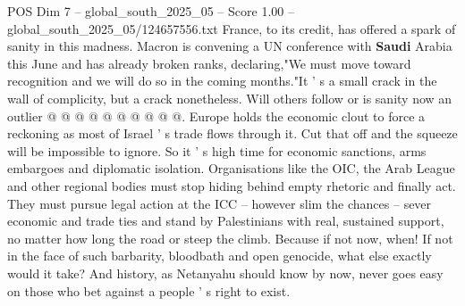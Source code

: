 \begin{textsample}{POS Dim 7 – global\_south\_2025\_05 – Score 1.00 – global\_south\_2025\_05/124657556.txt}
France, to its credit, has offered a spark of sanity in this madness.
Macron is convening a UN conference with \textbf{Saudi} Arabia this June and has already broken ranks, declaring,"We must move toward recognition and we will do so in the coming months."It ' s a small crack in the wall of complicity, but a crack nonetheless.
Will others follow or is sanity now an outlier @ @ @ @ @ @ @ @ @ @.
Europe holds the economic clout to force a reckoning as most of Israel ' s trade flows through it.
Cut that off and the squeeze will be impossible to ignore.
So it ' s high time for economic sanctions, arms embargoes and diplomatic isolation.
Organisations like the OIC, the Arab League and other regional bodies must stop hiding behind empty rhetoric and finally act.
They must pursue legal action at the ICC -- however slim the chances -- sever economic and trade ties and stand by Palestinians with real, sustained support, no matter how long the road or steep the climb.
Because if not now, when!
If not in the face of such barbarity, bloodbath and open genocide, what else exactly would it take?
And history, as Netanyahu should know by now, never goes easy on those who bet against a people ' s right to exist.

\end{textsample}
